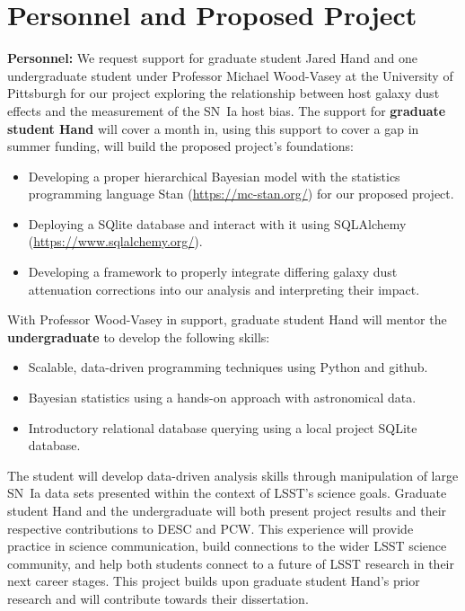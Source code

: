 \documentclass[modern]{aastex63}
\begin{document}
\section{Personnel and Proposed Project}
{\bf Personnel:}
We request support for graduate student Jared Hand and one undergraduate student under Professor Michael Wood-Vasey at the University of Pittsburgh for our project exploring the relationship between host galaxy dust effects and the measurement of the SN~Ia host bias.
The support for {\bf graduate student Hand} will cover a month in, using this support to cover a gap in summer funding, will build the proposed project's foundations:
\begin{itemize}
    \item Developing a proper hierarchical Bayesian model with the statistics programming language Stan ({\url{https://mc-stan.org/}}) for our proposed project.
    \item Deploying a SQlite database and interact with it using SQLAlchemy ({\url{https://www.sqlalchemy.org/}}).
    \item Developing a framework to properly integrate differing galaxy dust attenuation corrections into our analysis and interpreting their impact.
\end{itemize}
With Professor Wood-Vasey in support, graduate student Hand will mentor the {\bf undergraduate} to develop the following skills:
\begin{itemize}
    \item Scalable, data-driven programming techniques using Python and github.
    \item Bayesian statistics using a hands-on approach with astronomical data. 
    \item Introductory relational database querying using a local project SQLite database.
\end{itemize}
The student will develop data-driven analysis skills through manipulation of large SN~Ia data sets presented within the context of LSST's science goals.
Graduate student Hand and the undergraduate will both present project results and their respective contributions to DESC and PCW.
This experience will provide practice in science communication, build connections to the wider LSST science community, and help both students connect to a future of LSST research in their next career stages.
This project builds upon graduate student Hand's prior research \citep{Hand2021} and will contribute towards their dissertation.
\end{document}
